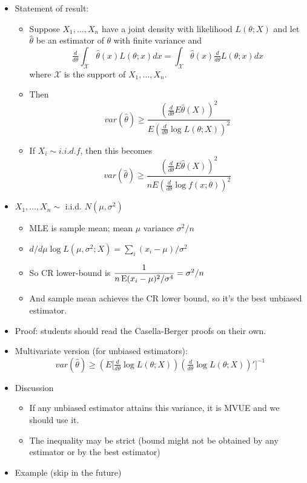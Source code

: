 \begin{itemize}
\item Statement of result:
\begin{itemize}
\item Suppose $X_1,\dots,X_n$ have a joint density with likelihood
         $L(\theta; X)$ and let $\hat\theta$ be an estimator of
         $\theta$ with finite variance and \[\tfrac{d}{d\theta} \int_\mathcal{X} \hat\theta(x) L(\theta; x) dx = \int_\mathcal{X} \hat\theta(x) \tfrac{d}{d\theta} L(\theta; x) dx\]
         where $\mathcal{X}$ is the support of $X_1,\dots,X_n$.
\item Then \[var(\hat\theta) \geq \frac{(\tfrac{d}{d\theta} E \hat\theta(X))^2}{E (\tfrac{d}{d\theta} \log L(\theta; X))^2}\]
\item If $X_i \sim i.i.d. f$, then this becomes
         \[var(\hat\theta) \geq \frac{(\tfrac{d}{d\theta} E \hat\theta(X))^2}{n E (\tfrac{d}{d\theta} \log f(x; \theta))^2}\]
\end{itemize}
\item $X_1,\dots,X_n \sim$ i.i.d. $N(\mu, \sigma^2)$
\begin{itemize}
\item MLE is sample mean; mean $\mu$ variance $\sigma^2/n$
\item $d/d\mu \log L(\mu, \sigma^2; X) = \sum_i (x_i - \mu)/\sigma^2$
\item So CR lower-bound is $\dfrac{1}{n \operatorname{E} (x_i-\mu)^2/\sigma^4} = \sigma^2/n$
\item And sample mean achieves the CR lower bound, so it's the best
         unbiased estimator.
\end{itemize}
\item Proof: students should read the Casella-Berger proofs on their own.
\item Multivariate version (for unbiased estimators):
       \[var(\hat\theta) \geq (E \Big[\tfrac{d}{d\theta} \log L(\theta; X)) (\tfrac{d}{d\theta} \log L(\theta; X))'\Big]^{-1}\]
\item Discussion
\begin{itemize}
\item If any unbiased estimator attains this variance, it is MVUE and
         we should use it.
\item The inequality may be strict (bound might not be obtained by any estimator or by the best estimator)
\end{itemize}
\item Example (skip in the future)
\begin{itemize}

\end{itemize}
\end{itemize}
